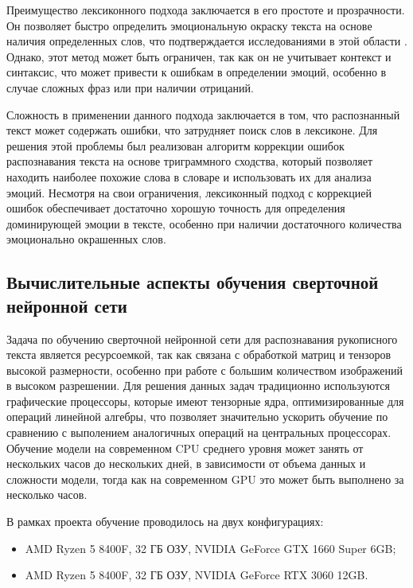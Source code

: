 \documentclass[12pt,a4paper]{article}
\begin{document}
Преимущество лексиконного подхода заключается в его простоте и прозрачности. Он позволяет быстро определить эмоциональную
окраску текста на основе наличия определенных слов, что подтверждается исследованиями в этой области \cite{anew1999, norms2013}. Однако, этот метод может быть ограничен, так как он не учитывает
контекст и синтаксис, что может привести к ошибкам в определении эмоций, особенно в случае сложных фраз или при наличии отрицаний.

Сложность в применении данного подхода заключается в том, что распознанный текст может содержать ошибки, что затрудняет поиск слов
в лексиконе. Для решения этой проблемы был реализован алгоритм коррекции ошибок распознавания текста на основе триграммного сходства, который позволяет
находить наиболее похожие слова в словаре и использовать их для анализа эмоций. Несмотря на свои ограничения, лексиконный подход
с коррекцией ошибок обеспечивает достаточно хорошую точность для определения доминирующей эмоции в тексте, особенно
при наличии достаточного количества эмоционально окрашенных слов.


\subsection{Вычислительные аспекты обучения сверточной нейронной сети}

Задача по обучению сверточной нейронной сети для распознавания рукописного текста является ресурсоемкой,
так как связана с обработкой матриц и тензоров высокой размерности, особенно при работе с большим количеством
изображений в высоком разрешении. Для решения данных задач традиционно используются графические процессоры, которые
имеют тензорные ядра, оптимизированные для операций линейной алгебры, что позволяет значительно ускорить
обучение по сравнению с выполением аналогичных операций на центральных процессорах.
Обучение модели на современном CPU среднего уровня может занять от нескольких часов до нескольких дней,
в зависимости от объема данных и сложности модели, тогда как на современном GPU это может быть выполнено
за несколько часов.

В рамках проекта обучение проводилось на двух конфигурациях:

\begin{itemize}
    \item AMD Ryzen 5 8400F, 32 ГБ ОЗУ, NVIDIA GeForce GTX 1660 Super 6GB;
    \item AMD Ryzen 5 8400F, 32 ГБ ОЗУ, NVIDIA GeForce RTX 3060 12GB.
\end{itemize}
\end{document}

